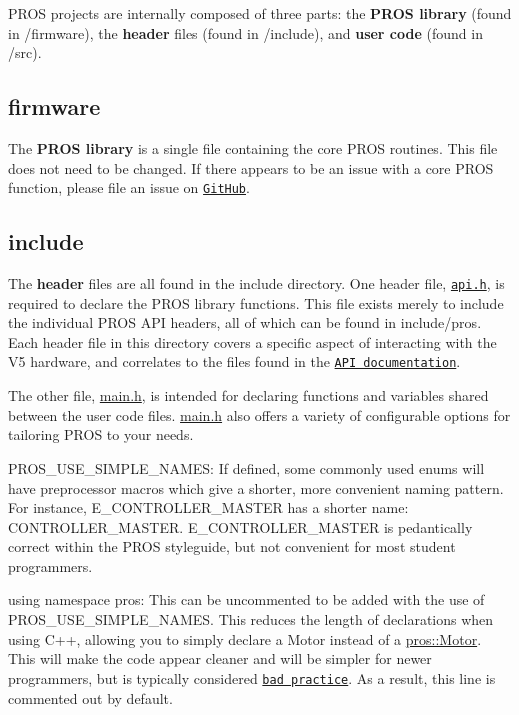 P\+R\+OS projects are internally composed of three parts\+: the {\bfseries P\+R\+OS library} (found in {\ttfamily /firmware}), the {\bfseries header} files (found in {\ttfamily /include}), and {\bfseries user code} (found in {\ttfamily /src}).

\subsection*{firmware}

The {\bfseries P\+R\+OS library} is a single file containing the core P\+R\+OS routines. This file does not need to be changed. If there appears to be an issue with a core P\+R\+OS function, please file an issue on \href{https://github.com/purduesigbots/pros/issues}{\tt Git\+Hub}.

\subsection*{include}

The {\bfseries header} files are all found in the {\ttfamily include} directory. One header file, \href{../../api/index.html}{\tt api.\+h}, is required to declare the P\+R\+OS library functions. This file exists merely to include the individual P\+R\+OS A\+PI headers, all of which can be found in {\ttfamily include/pros}. Each header file in this directory covers a specific aspect of interacting with the V5 hardware, and correlates to the files found in the \href{../../api/index.html}{\tt A\+PI documentation}.

The other file, {\ttfamily \hyperlink{main_8h}{main.\+h}}, is intended for declaring functions and variables shared between the user code files. {\ttfamily \hyperlink{main_8h}{main.\+h}} also offers a variety of configurable options for tailoring P\+R\+OS to your needs.


\begin{DoxyItemize}
\item {\ttfamily P\+R\+O\+S\+\_\+\+U\+S\+E\+\_\+\+S\+I\+M\+P\+L\+E\+\_\+\+N\+A\+M\+ES}\+: If defined, some commonly used enums will have preprocessor macros which give a shorter, more convenient naming pattern. For instance, E\+\_\+\+C\+O\+N\+T\+R\+O\+L\+L\+E\+R\+\_\+\+M\+A\+S\+T\+ER has a shorter name\+: {\ttfamily C\+O\+N\+T\+R\+O\+L\+L\+E\+R\+\_\+\+M\+A\+S\+T\+ER}. {\ttfamily E\+\_\+\+C\+O\+N\+T\+R\+O\+L\+L\+E\+R\+\_\+\+M\+A\+S\+T\+ER} is pedantically correct within the P\+R\+OS styleguide, but not convenient for most student programmers.
\item {\ttfamily using namespace pros}\+: This can be uncommented to be added with the use of {\ttfamily P\+R\+O\+S\+\_\+\+U\+S\+E\+\_\+\+S\+I\+M\+P\+L\+E\+\_\+\+N\+A\+M\+ES}. This reduces the length of declarations when using C++, allowing you to simply declare a {\ttfamily Motor} instead of a {\ttfamily \hyperlink{classpros_1_1Motor}{pros\+::\+Motor}}. This will make the code appear cleaner and will be simpler for newer programmers, but is typically considered \href{https://msdn.microsoft.com/en-us/library/5cb46ksf.aspx}{\tt bad practice}. As a result, this line is commented out by default.
\end{DoxyItemize}

